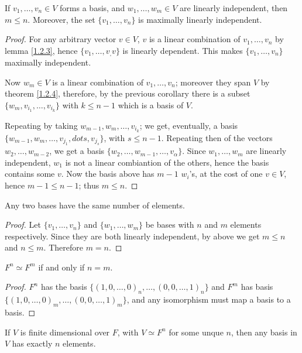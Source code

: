 \begin{lemma}\label{1.2.6}
    If $ v_1, \dots, v_n \in V$ forms a basis, and $ w_1, \dots, w_m \in V$ are
    linearly independent, then $m \leq n$. Moreover, the set $\{v_1, \dots,
    v_n\}$ is maximally linearly independent.
\end{lemma}
\begin{proof}
    For any arbitrary vector $v \in V$,  $v$ is a linear combination of  $ v_1,
    \dots, v_n$ by lemma \ref {1.2.3}, hence $\{v_1, \dots, v_,v\}$ is linearly
    dependent. This makes $\{v_1, \dots, v_n\}$ maximally independent.

    Now $w_m \in V$ is a linear combination of  $ v_1, \dots, v_n$; moreover
    they span $V$ by theorem \ref{1.2.4}, therefore, by the previous corollary
    there is a subset $\{w_m,v_{i_1}, \dots, v_{i_k}\}$ with $k \leq n-1$ which
    is a basis of  $V$.

    Repeating by taking  $w_{m-1},w_m, \dots, v_{i_k}$; we get, eventually, a
    basis $\{w_{m-1},w_m, \dots, v_{j_1}, dots, v_{j_s}\}$, with $s \leq n-1$.
    Repeating then of the vectors  $ w_2, \dots, w_{m-2}$, we get a basis
    $\{w_2,\dots, w_{m-1}, \dots, v_\alpha\}$. Since $ w_1, \dots, w_m$ are
    linearly independent, $ w_1$ is not a linear combiantion of the others,
    hence the basis contains some $v$. Now the basis above has  $m-1$  $w_i$'s,
    at the cost of one  $v \in V$, hence  $m-1 \leq n-1$; thus  $m \leq n$.
\end{proof}
\begin{corollary}
    Any two bases have the same number of elements.
\end{corollary}
\begin{proof}
    Let $\{v_1, \dots, v_n\}$ and $\{w_1, \dots, w_m\}$ be bases with $n$ and
    $m$ elements respectively. Since they are both linearly independent, by
    above we get  $m \leq n$ and  $n 
    \leq m$. Therefore  $m=n$.
\end{proof}
\begin{corollary}
    $F^n \simeq F^m$ if and only if  $n=m$.
\end{corollary}
\begin{proof}
    $F^n$ has the basis  $\{(1,0, \dots, 0)_n, \dots, (0,0, \dots, 1)_n\}$ and
    $F^m$ has basis  $\{(1,0, \dots, 0)_m, \dots, (0,0, \dots, 1)_m\}$, and any
    isomorphism must map a basis to a basis.
\end{proof}
\begin{corollary}
    If $V$ is finite dimensional over  $F$, with  $V \simeq F^n$ for some unque
     $n$, then  any basis in $V$ has exactly  $n$ elements.
\end{corollary}

